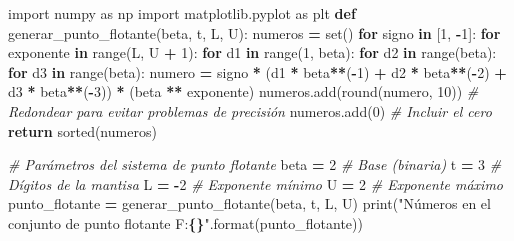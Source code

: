 \documentclass[
]{article}
\newenvironment{Shaded}{\begin{snugshade}}{\end{snugshade}}
\newcommand{\BuiltInTok}[1]{#1}
\newcommand{\CommentTok}[1]{\textcolor[rgb]{0.56,0.35,0.01}{\textit{#1}}}
\newcommand{\ControlFlowTok}[1]{\textcolor[rgb]{0.13,0.29,0.53}{\textbf{#1}}}
\newcommand{\DecValTok}[1]{\textcolor[rgb]{0.00,0.00,0.81}{#1}}
\newcommand{\ImportTok}[1]{#1}
\newcommand{\KeywordTok}[1]{\textcolor[rgb]{0.13,0.29,0.53}{\textbf{#1}}}
\newcommand{\NormalTok}[1]{#1}
\newcommand{\OperatorTok}[1]{\textcolor[rgb]{0.81,0.36,0.00}{\textbf{#1}}}
\newcommand{\SpecialCharTok}[1]{\textcolor[rgb]{0.81,0.36,0.00}{\textbf{#1}}}
\newcommand{\StringTok}[1]{\textcolor[rgb]{0.31,0.60,0.02}{#1}}
\begin{document}
\begin{Shaded}
\begin{Highlighting}[]
\ImportTok{import}\NormalTok{ numpy }\ImportTok{as}\NormalTok{ np}
\ImportTok{import}\NormalTok{ matplotlib.pyplot }\ImportTok{as}\NormalTok{ plt}
\KeywordTok{def}\NormalTok{ generar\_punto\_flotante(beta, t, L, U):}
\NormalTok{    numeros }\OperatorTok{=} \BuiltInTok{set}\NormalTok{()}
    \ControlFlowTok{for}\NormalTok{ signo }\KeywordTok{in}\NormalTok{ [}\DecValTok{1}\NormalTok{, }\OperatorTok{{-}}\DecValTok{1}\NormalTok{]:}
        \ControlFlowTok{for}\NormalTok{ exponente }\KeywordTok{in} \BuiltInTok{range}\NormalTok{(L, U }\OperatorTok{+} \DecValTok{1}\NormalTok{):}
            \ControlFlowTok{for}\NormalTok{ d1 }\KeywordTok{in} \BuiltInTok{range}\NormalTok{(}\DecValTok{1}\NormalTok{, beta):}
                \ControlFlowTok{for}\NormalTok{ d2 }\KeywordTok{in} \BuiltInTok{range}\NormalTok{(beta):}
                    \ControlFlowTok{for}\NormalTok{ d3 }\KeywordTok{in} \BuiltInTok{range}\NormalTok{(beta):}
\NormalTok{                        numero }\OperatorTok{=}\NormalTok{ signo }\OperatorTok{*}\NormalTok{ (d1 }\OperatorTok{*}\NormalTok{ beta}\OperatorTok{**}\NormalTok{(}\OperatorTok{{-}}\DecValTok{1}\NormalTok{) }\OperatorTok{+}\NormalTok{ d2 }\OperatorTok{*}\NormalTok{ beta}\OperatorTok{**}\NormalTok{(}\OperatorTok{{-}}\DecValTok{2}\NormalTok{) }\OperatorTok{+}\NormalTok{ d3 }\OperatorTok{*}\NormalTok{ beta}\OperatorTok{**}\NormalTok{(}\OperatorTok{{-}}\DecValTok{3}\NormalTok{)) }\OperatorTok{*}\NormalTok{ (beta }\OperatorTok{**}\NormalTok{ exponente)}
\NormalTok{                        numeros.add(}\BuiltInTok{round}\NormalTok{(numero, }\DecValTok{10}\NormalTok{))  }\CommentTok{\# Redondear para evitar problemas de precisión}
\NormalTok{    numeros.add(}\DecValTok{0}\NormalTok{)  }\CommentTok{\# Incluir el cero}
    \ControlFlowTok{return} \BuiltInTok{sorted}\NormalTok{(numeros)}

\CommentTok{\# Parámetros del sistema de punto flotante}
\NormalTok{beta }\OperatorTok{=} \DecValTok{2}  \CommentTok{\# Base (binaria)}
\NormalTok{t }\OperatorTok{=} \DecValTok{3}     \CommentTok{\# Dígitos de la mantisa}
\NormalTok{L }\OperatorTok{=} \OperatorTok{{-}}\DecValTok{2}    \CommentTok{\# Exponente mínimo}
\NormalTok{U }\OperatorTok{=} \DecValTok{2}     \CommentTok{\# Exponente máximo}
\NormalTok{punto\_flotante }\OperatorTok{=}\NormalTok{ generar\_punto\_flotante(beta, t, L, U)}
\BuiltInTok{print}\NormalTok{(}\StringTok{"Números en el conjunto de punto flotante F:}\SpecialCharTok{\{\}}\StringTok{"}\NormalTok{.}\BuiltInTok{format}\NormalTok{(punto\_flotante))}
\end{Highlighting}
\end{Shaded}
\end{document}
